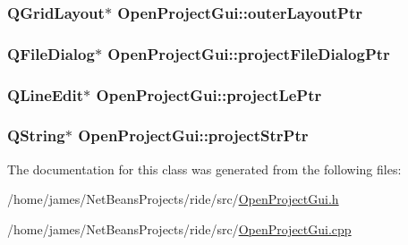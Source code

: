 \hypertarget{class_open_project_gui_ab83addd5cbd6d61872347b850c2d9981}{
\subsubsection[{outer\-Layout\-Ptr}]{\setlength{\rightskip}{0pt plus 5cm}Q\-Grid\-Layout$\ast$ Open\-Project\-Gui\-::outer\-Layout\-Ptr\hspace{0.3cm}{\ttfamily [private]}}}\label{class_open_project_gui_ab83addd5cbd6d61872347b850c2d9981}
\hypertarget{class_open_project_gui_a897656f67bf72dedd1fca9fe1291b28d}{
\subsubsection[{project\-File\-Dialog\-Ptr}]{\setlength{\rightskip}{0pt plus 5cm}Q\-File\-Dialog$\ast$ Open\-Project\-Gui\-::project\-File\-Dialog\-Ptr\hspace{0.3cm}{\ttfamily [private]}}}\label{class_open_project_gui_a897656f67bf72dedd1fca9fe1291b28d}
\hypertarget{class_open_project_gui_ae36ed1a918868075f2cbadb359dafdbb}{
\subsubsection[{project\-Le\-Ptr}]{\setlength{\rightskip}{0pt plus 5cm}Q\-Line\-Edit$\ast$ Open\-Project\-Gui\-::project\-Le\-Ptr\hspace{0.3cm}{\ttfamily [private]}}}\label{class_open_project_gui_ae36ed1a918868075f2cbadb359dafdbb}
\hypertarget{class_open_project_gui_aadab89933dc3fe2a0bbdb1f1b7e886b7}{
\subsubsection[{project\-Str\-Ptr}]{\setlength{\rightskip}{0pt plus 5cm}Q\-String$\ast$ Open\-Project\-Gui\-::project\-Str\-Ptr\hspace{0.3cm}{\ttfamily [private]}}}\label{class_open_project_gui_aadab89933dc3fe2a0bbdb1f1b7e886b7}


The documentation for this class was generated from the following files\-:\begin{DoxyCompactItemize}
\item 
/home/james/\-Net\-Beans\-Projects/ride/src/\hyperlink{_open_project_gui_8h}{Open\-Project\-Gui.\-h}\item 
/home/james/\-Net\-Beans\-Projects/ride/src/\hyperlink{_open_project_gui_8cpp}{Open\-Project\-Gui.\-cpp}\end{DoxyCompactItemize}
